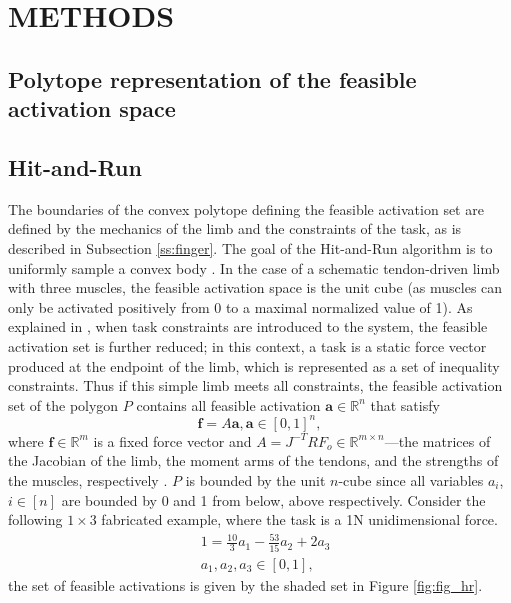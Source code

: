 \section{METHODS}

\subsection{Polytope representation of the feasible activation space}

\subsection{Hit-and-Run}
The boundaries of the convex polytope defining the feasible activation set are defined by the mechanics of the limb and the constraints of the task, as is described in Subsection \ref{ss:finger}. The goal of the Hit-and-Run algorithm is to uniformly sample a convex body \cite{smith1984efficient}. 
In the case of a schematic tendon-driven limb with three muscles, the feasible activation space is the unit cube (as muscles can only be activated positively from 0 to a maximal normalized value of 1). As explained in \cite{Valero-Cuevas2009mathematical}, when task constraints are introduced to the system, the feasible activation set is further reduced; in this context, a task is a static force vector produced at the endpoint of the limb, which is represented as a set of inequality constraints. Thus if this simple limb meets all constraints, the feasible activation set of the polygon $P$ contains all feasible activation  $\textbf{a} \in \mathbb{R}^n$ that satisfy
\[\textbf{f} = A\textbf{a}, \textbf{a} \in [0,1]^n,\]
where $\textbf{f} \in \mathbb{R}^m$ is a fixed force vector and $A = J^{-T}RF_o \in \mathbb{R}^{m \times n}$---the matrices of the Jacobian of the limb, the moment arms of the tendons, and the strengths of the muscles, respectively \cite{Valero-Cuevas1998Large,Valero-Cuevas2009mathematical}. $P$ is bounded by the unit $n$-cube since all variables $a_i$, $i \in [n]$ are bounded by 0 and 1 from below, above respectively.
Consider the following $1 \times 3$ fabricated example, where the task is a 1N unidimensional force.
\begin{align*}
&1 = \frac{10}{3}a_1 - \frac{53}{15}a_2 + 2a_3 \\
&a_1, a_2, a_3 \in [0,1],
\end{align*}
the set of feasible activations is given by the shaded set in Figure \ref{fig:fig_hr}.

